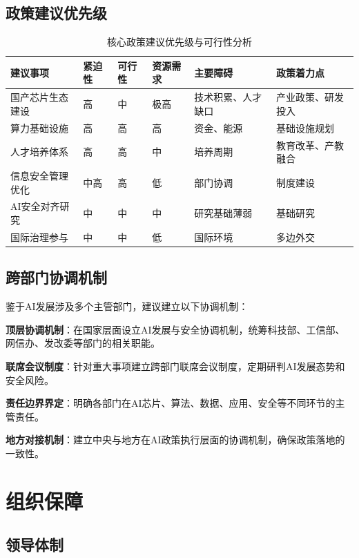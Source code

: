\subsection{政策建议优先级}

\begin{table}[H]
\centering
\caption{核心政策建议优先级与可行性分析}
\small
\begin{tabular}{p{2.5cm}p{1cm}p{1cm}p{1.2cm}p{3cm}p{3cm}}
\toprule
\textbf{建议事项} & \textbf{紧迫性} & \textbf{可行性} & \textbf{资源需求} & \textbf{主要障碍} & \textbf{政策着力点} \\
\midrule
国产芯片生态建设 & 高 & 中 & 极高 & 技术积累、人才缺口 & 产业政策、研发投入 \\
算力基础设施 & 高 & 高 & 高 & 资金、能源 & 基础设施规划 \\
人才培养体系 & 高 & 高 & 中 & 培养周期 & 教育改革、产教融合 \\
信息安全管理优化 & 中高 & 高 & 低 & 部门协调 & 制度建设 \\
AI安全对齐研究 & 中 & 中 & 中 & 研究基础薄弱 & 基础研究 \\
国际治理参与 & 中 & 中 & 低 & 国际环境 & 多边外交 \\
\bottomrule
\end{tabular}
\end{table}

\subsection{跨部门协调机制}

鉴于AI发展涉及多个主管部门，建议建立以下协调机制：

\textbf{顶层协调机制}：在国家层面设立AI发展与安全协调机制，统筹科技部、工信部、网信办、发改委等部门的相关职能。

\textbf{联席会议制度}：针对重大事项建立跨部门联席会议制度，定期研判AI发展态势和安全风险。

\textbf{责任边界界定}：明确各部门在AI芯片、算法、数据、应用、安全等不同环节的主管责任。

\textbf{地方对接机制}：建立中央与地方在AI政策执行层面的协调机制，确保政策落地的一致性。

\section{组织保障}

\subsection{领导体制}

